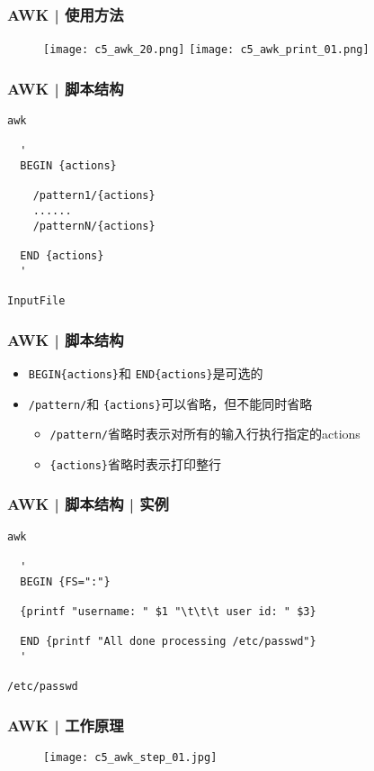 \begin{frame}[fragile]
  \frametitle{AWK | 使用方法}
  \begin{figure}
    \centering
    \texttt{[image: c5\_awk\_20.png]}
    \vspace{0.5cm}
    \texttt{[image: c5\_awk\_print\_01.png]}
  \end{figure}
\end{frame}

\begin{frame}[fragile]
  \frametitle{AWK | \alert{脚本结构}}
\begin{lstlisting}
awk

  '
  BEGIN {actions}

    /pattern1/{actions}
    ......
    /patternN/{actions}

  END {actions}
  '

InputFile
\end{lstlisting}
\end{frame}

\begin{frame}[fragile]
  \frametitle{AWK | 脚本结构}
  \begin{itemize}
    \item \verb|BEGIN{actions}|和 \verb|END{actions}|是可选的
    \item \verb|/pattern/|和 \verb|{actions}|可以省略，但不能同时省略
      \begin{itemize}
        \item \verb|/pattern/|省略时表示对所有的输入行执行指定的actions
        \item \verb|{actions}|省略时表示打印整行
      \end{itemize}
  \end{itemize}
\end{frame}

\begin{frame}[fragile,label=example]
  \frametitle{AWK | 脚本结构 | 实例}
\begin{lstlisting}
awk

  '
  BEGIN {FS=":"}

  {printf "username: " $1 "\t\t\t user id: " $3}

  END {printf "All done processing /etc/passwd"}
  '

/etc/passwd
\end{lstlisting}
\end{frame}


\begin{frame}
  \frametitle{AWK | \alert{工作原理}}
  \begin{figure}
    \centering
    \texttt{[image: c5\_awk\_step\_01.jpg]}
  \end{figure}
\end{frame}

